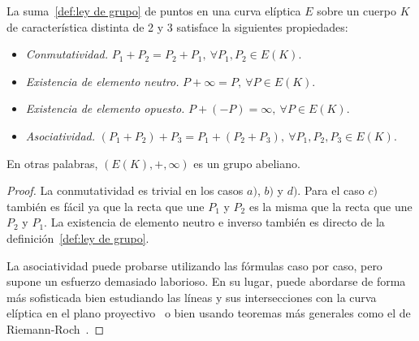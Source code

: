 \begin{teorema}
	La suma~\ref{def:ley de grupo} de puntos en una curva elíptica $E$ sobre un cuerpo $K$ de característica distinta de 2 y 3 satisface la siguientes propiedades:
	\begin{itemize}
		\item \emph{Conmutatividad.} $P_1 + P_2 = P_2 + P_1,\ \forall P_1, P_2 \in E(K)$.
		\item \emph{Existencia de elemento neutro.} $P + \infty = P,\ \forall P \in E(K)$.
		\item \emph{Existencia de elemento opuesto.} $P + (-P) = \infty,\ \forall P \in E(K)$.
		\item \emph{Asociatividad.} $(P_1 + P_2) + P_3 = P_1 + (P_2 + P_3),\ \forall P_1, P_2, P_3 \in E(K)$.
	\end{itemize}
	En otras palabras, $(E(K), +, \infty)$ es un grupo abeliano.
\end{teorema}
\begin{proof}
La conmutatividad es trivial en los casos $a)$, $b)$ y $d)$. Para el caso $c)$ también es fácil ya que la recta que une $P_1$ y $P_2$ es la misma que la recta que une $P_2$ y $P_1$. La existencia de elemento neutro e inverso también es directo de la definición~\ref{def:ley de grupo}.

La asociatividad puede probarse utilizando las fórmulas caso por caso, pero supone un esfuerzo demasiado laborioso. En su lugar, puede abordarse de forma más sofisticada bien estudiando las líneas y sus intersecciones con la curva elíptica en el plano proyectivo~\cite[sec. 2.4]{Washington:2008} o bien usando teoremas más generales como el de Riemann-Roch~\cite[teo. III.3.4.e]{Silverman:2009}.
\end{proof}
